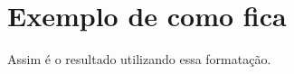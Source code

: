 \documentclass[a4paper,12pt]{article}
\begin{document}
 
\section*{Exemplo de como fica}
 
Assim é o resultado utilizando essa formatação.
 
\end{document}
